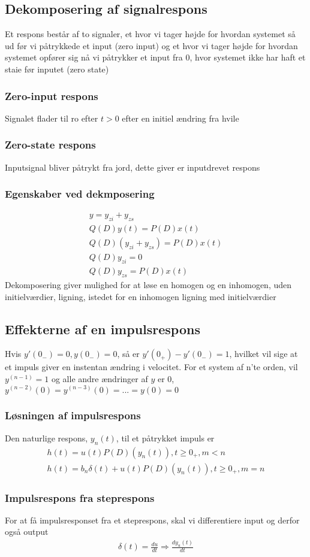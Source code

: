\subsection{Dekomposering af signalrespons}
	Et respons består af to signaler, et hvor vi tager højde for hvordan systemet så ud før vi påtrykkede et input (zero input) og et hvor vi tager højde for hvordan systemet opfører sig nå vi påtrykker et input fra 0, hvor systemet ikke har haft et staie før inputet (zero state)
	\subsubsection{Zero-input respons}
		Signalet flader til ro efter $t>0$ efter en initiel ændring fra hvile

	\subsubsection{Zero-state respons}
		Inputsignal bliver påtrykt fra jord, dette giver er inputdrevet respons
	
	\subsubsection{Egenskaber ved dekmposering}
		\begin{align}
			y=y_{zi}+y_{zs}\\
			Q(D)y(t)=P(D)x(t)\\
			Q(D)(y_{zi}+y_{zs})=P(D)x(t)\\
			Q(D)y_{zi}=0\\
			Q(D)y_{zs}=P(D)x(t)
		\end{align}
		Dekomposering giver mulighed for at løse en homogen og en inhomogen, uden initielværdier, ligning, istedet for en inhomogen ligning med initielværdier

\subsection{Effekterne af en impulsrespons}
	Hvis $y'(0_-)=0,y(0_-)=0$, så er $y'(0_+)-y'(0_-)=1$, hvilket vil sige at et impuls giver en instentan ændring i velocitet. For et system af n'te orden, vil $y^{(n-1)}=1$ og alle andre ændringer af $y$ er 0, $y^{(n-2)}(0)=y^{(n-3)}(0)=...=y(0)=0$

	\subsubsection{Løsningen af impulsrespons}
		Den naturlige respons, $y_n(t)$, til et påtrykket impuls er
		\begin{align}
			h(t)=u(t)P(D)(y_n(t)),t\geq 0_+,m<n\\
			h(t)=b_n\delta(t)+u(t)P(D)(y_n(t)),t\geq 0_+,m=n
		\end{align}

	\subsubsection{Impulsrespons fra steprespons}
		For at få impulsresponset fra et steprespons, skal vi differentiere input og derfor også output
		\begin{align}
			\delta(t)=\frac{du}{dt}\Rightarrow\frac{dy_u(t)}{dt}
		\end{align}